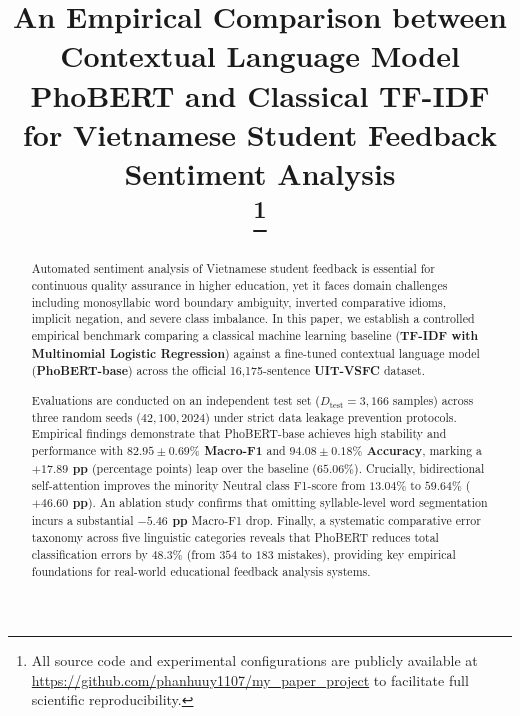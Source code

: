 \documentclass[conference]{IEEEtran}
\begin{document}
\title{An Empirical Comparison between Contextual Language Model PhoBERT and Classical TF-IDF for Vietnamese Student Feedback Sentiment Analysis\\
\thanks{All source code and experimental configurations are publicly available at \url{https://github.com/phanhuuy1107/my_paper_project} to facilitate full scientific reproducibility.}
}

\author{
}

\maketitle

\begin{abstract}
Automated sentiment analysis of Vietnamese student feedback is essential for continuous quality assurance in higher education, yet it faces domain challenges including monosyllabic word boundary ambiguity, inverted comparative idioms, implicit negation, and severe class imbalance. In this paper, we establish a controlled empirical benchmark comparing a classical machine learning baseline (\textbf{TF-IDF with Multinomial Logistic Regression}) against a fine-tuned contextual language model (\textbf{PhoBERT-base}) across the official 16,175-sentence \textbf{UIT-VSFC} dataset.

Evaluations are conducted on an independent test set ($D_{\text{test}} = 3,166$ samples) across three random seeds ($42, 100, 2024$) under strict data leakage prevention protocols. Empirical findings demonstrate that PhoBERT-base achieves high stability and performance with \textbf{$82.95 \pm 0.69\%$ Macro-F1} and \textbf{$94.08 \pm 0.18\%$ Accuracy}, marking a \textbf{$+17.89$ pp} (percentage points) leap over the baseline ($65.06\%$). Crucially, bidirectional self-attention improves the minority Neutral class F1-score from $13.04\%$ to $59.64\%$ (\textbf{$+46.60$ pp}). An ablation study confirms that omitting syllable-level word segmentation incurs a substantial \textbf{$-5.46$ pp} Macro-F1 drop. Finally, a systematic comparative error taxonomy across five linguistic categories reveals that PhoBERT reduces total classification errors by \textbf{$48.3\%$} (from $354$ to $183$ mistakes), providing key empirical foundations for real-world educational feedback analysis systems.
\end{abstract}
\end{document}

